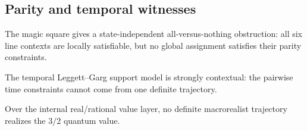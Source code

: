 \subsection{Parity and temporal witnesses}

\begin{theorem}\label{thm:magic-square-strong-contextual}\leanok{}
The magic square gives a state-independent all-versus-nothing obstruction:
all six line contexts are locally satisfiable, but no global assignment
satisfies their parity constraints.
\end{theorem}

\begin{theorem}\label{thm:leggett-garg-macrorealism-violated}\leanok{}
The temporal Leggett--Garg support model is strongly contextual: the pairwise
time constraints cannot come from one definite trajectory.
\end{theorem}

\begin{theorem}\label{thm:leggett-garg-real-separation}\leanok{}
Over the internal real/rational value layer, no definite macrorealist
trajectory realizes the \(3/2\) quantum value.
\end{theorem}
